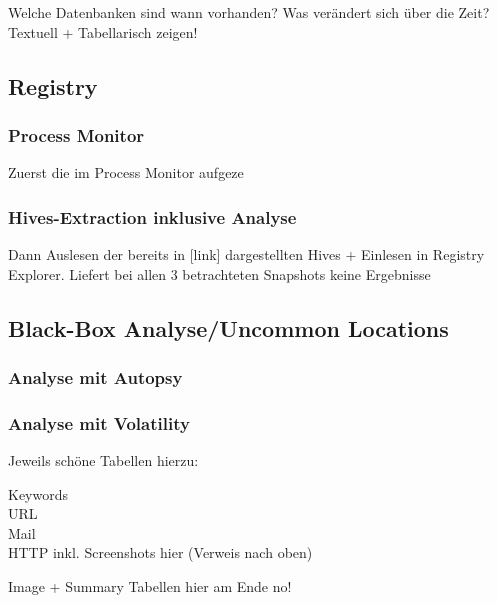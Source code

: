 Welche Datenbanken sind wann vorhanden? Was verändert sich über die Zeit? Textuell + Tabellarisch zeigen!

\subsection*{Registry}

\subsubsection*{Process Monitor}

Zuerst die im Process Monitor aufgeze

\subsubsection*{Hives-Extraction inklusive Analyse}

Dann Auslesen der bereits in [link] dargestellten Hives + Einlesen in Registry Explorer. Liefert bei allen 3 betrachteten Snapshots keine Ergebnisse

\subsection*{Black-Box Analyse/Uncommon Locations}

\subsubsection*{Analyse mit Autopsy}

\subsubsection*{Analyse mit Volatility}

Jeweils schöne Tabellen hierzu:

Keywords\\
URL\\
Mail \\
HTTP inkl. Screenshots hier (Verweis nach oben)

Image + Summary Tabellen hier am Ende no!

